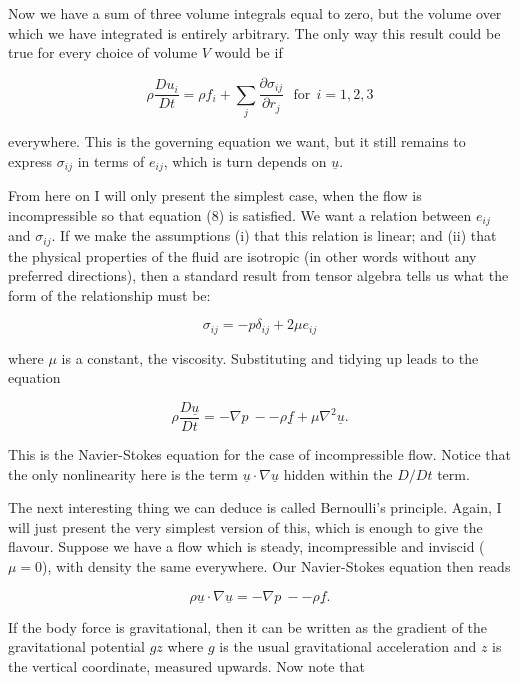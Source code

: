   Now we have a sum of three volume integrals equal to zero, but the volume 
  over which we have integrated is entirely arbitrary. The only way this result 
  could be true for every choice of volume $V$ would be if 

  $$\rho \dfrac{Du_i}{Dt}=\rho f_i+\sum_j{\dfrac{\partial \sigma_{ij}}{\partial 
  r_j}}\mathrm{~~~for~~}i=1,2,3 \tag{20}$$ 

  everywhere. This is the governing equation we want, but it still remains to 
  express $\sigma_{ij}$ in terms of $e_{ij}$, which is turn depends on 
  $\underline{u}$. 

  From here on I will only present the simplest case, when the flow is 
  incompressible so that equation (8) is satisfied. We want a relation between 
  $e_{ij}$ and $\sigma_{ij}$. If we make the assumptions (i) that this relation 
  is linear; and (ii) that the physical properties of the fluid are isotropic 
  (in other words without any preferred directions), then a standard result 
  from tensor algebra tells us what the form of the relationship must be: 

  $$\sigma_{ij} = -p \delta_{ij} + 2 \mu e_{ij} \tag{21}$$ 

  where $\mu$ is a constant, the viscosity. Substituting and tidying up leads 
  to the equation 

  $$\rho \dfrac{D \underline{u}}{Dt}= -\nabla p \mathrm{~} -- \rho 
  \underline{f}+\mu \nabla^2 \underline{u}. \tag{22}$$ 

  This is the Navier-Stokes equation for the case of incompressible flow. 
  Notice that the only nonlinearity here is the term $\underline{u} \cdot 
  \nabla \underline{u}$ hidden within the $D/Dt$ term. 

  The next interesting thing we can deduce is called Bernoulli's principle. 
  Again, I will just present the very simplest version of this, which is enough 
  to give the flavour. Suppose we have a flow which is steady, incompressible 
  and inviscid ($\mu=0$), with density the same everywhere. Our Navier-Stokes 
  equation then reads 

  $$\rho \underline{u} \cdot \nabla \underline{u}= -\nabla p \mathrm{~} -- \rho 
  \underline{f} . \tag{23}$$ 

  If the body force is gravitational, then it can be written as the gradient of 
  the gravitational potential $gz$ where $g$ is the usual gravitational 
  acceleration and $z$ is the vertical coordinate, measured upwards. Now note 
  that 

